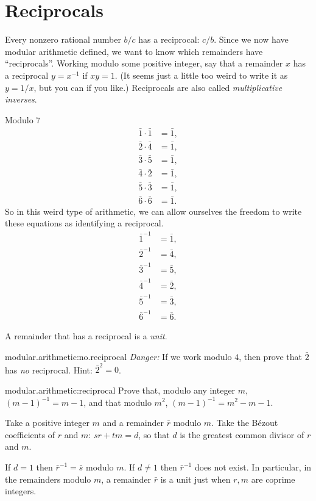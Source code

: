 \section{Reciprocals}
Every nonzero rational number \(b/c\) has a reciprocal: \(c/b\).
Since we now have modular arithmetic defined, we want to know which remainders have ``reciprocals''.
Working modulo some positive integer, say that a remainder \(x\) has a reciprocal \(y=x^{-1}\) if \(xy=1\).
(It seems just a little too weird to write it as \(y=1/x\), but you can if you like.)
Reciprocals are also called \emph{multiplicative inverses}.
\begin{example}
Modulo \(7\)
\begin{align*}
\bar{1} \cdot \bar{1} &= \bar{1}, \\
\bar{2} \cdot \bar{4} &= \bar{1}, \\
\bar{3} \cdot \bar{5} &= \bar{1}, \\
\bar{4} \cdot \bar{2} &= \bar{1}, \\
\bar{5} \cdot \bar{3} &= \bar{1}, \\
\bar{6} \cdot \bar{6} &= \bar{1}.
\end{align*}
So in this weird type of arithmetic, we can allow ourselves the freedom to write these equations as identifying a reciprocal.
\begin{align*}
\bar{1}^{-1} &= \bar{1}, \\
\bar{2}^{-1} &= \bar{4}, \\
\bar{3}^{-1} &= \bar{5}, \\
\bar{4}^{-1} &= \bar{2}, \\
\bar{5}^{-1} &= \bar{3}, \\
\bar{6}^{-1} &= \bar{6}.
\end{align*}
\end{example}
A remainder that has a reciprocal is a \emph{unit}.
\begin{problem}{modular.arithmetic:no.reciprocal}
\emph{Danger:} If we work modulo \(4\), then prove that \(\bar{2}\) has \emph{no} reciprocal.
Hint: \(\bar{2}^2=0\).
\end{problem}
\begin{problem}{modular.arithmetic:reciprocal}
Prove that, modulo any integer \(m\), \((m-1)^{-1}=m-1\), and that modulo \(m^2\), \((m-1)^{-1}=m^2-m-1\).
\end{problem}
\begin{theorem}
Take a positive integer \(m\) and a remainder \(\bar{r}\) modulo \(m\).
Take the B\'ezout coefficients of \(r\) and \(m\): \(sr+tm=d\), so that \(d\) is the greatest common divisor of \(r\) and \(m\).

If \(d=1\) then \(\bar{r}^{-1}=\bar{s}\) modulo \(m\).
If \(d \ne 1\) then \(\bar{r}^{-1}\) does not exist.
In particular, in the remainders modulo \(m\), a remainder \(\bar{r}\) is a unit just when \(r,m\) are coprime integers.
\end{theorem}
